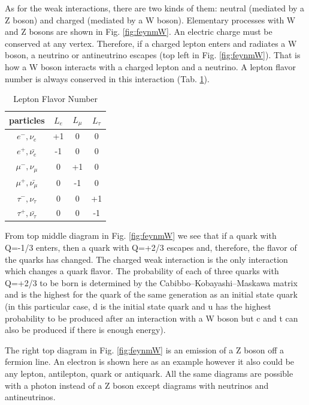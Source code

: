 As for the weak interactions, there are two kinds of them: neutral (mediated by a Z boson) and charged (mediated by a W boson). Elementary processes with W and Z bosons are shown in Fig. \ref{fig:feynmW}. An electric charge must be conserved at any vertex. Therefore, if a charged lepton enters and radiates a W boson, a neutrino or antineutrino escapes (top left in Fig. \ref{fig:feynmW}). That is how a W boson interacts with a charged lepton and a neutrino. A lepton flavor number is always conserved in this interaction (Tab. \ref{tab:LeptonFlavorNumber}). 

 \begin{table}[h]
  \begin{center}
  \caption{ Lepton Flavor Number}
  \begin{tabular}{|c|c|c|c|}
     particles & $L_e$ & $L_{\mu}$ & $L_{\tau}$ \\ \hline
     $e^-,\nu_e$ &  +1  &  0  &  0  \\ \hline 
     $e^+, \bar{\nu_e}$ &  -1  &  0  &  0  \\ \hline 
     $\mu^-,\nu_{\mu}$ &  0  &  +1  &  0  \\ \hline 
     $\mu^+, \bar{\nu_{\mu}}$ &  0  &  -1  &  0  \\ \hline 
     $\tau^-,\nu_{\tau}$ &  0  &  0  &  +1  \\ \hline 
     $\tau^+, \bar{\nu_{\tau}}$ &  0  &  0  &  -1  \\ \hline 
  \end{tabular}
  \label{tab:LeptonFlavorNumber}
  \end{center}
\end{table}

From top middle diagram in Fig. \ref{fig:feynmW} we see that if a quark with Q=-1/3 enters, then a quark with Q=+2/3 escapes and, therefore, the flavor of the quarks has changed. The charged weak interaction is the only interaction which changes a quark flavor. The probability of each of three quarks with Q=+2/3 to be born is determined by the Cabibbo–Kobayashi–Maskawa matrix and is the highest for the quark of the same generation as an initial state quark (in this particular case, d is the initial state quark and u has the highest probability to be produced after an interaction with a W boson but c and t can also be produced if there is enough energy).

The right top diagram in Fig. \ref{fig:feynmW} is an emission of a Z boson off a fermion line. An electron is shown here as an example however it also could be any lepton, antilepton, quark or antiquark. All the same diagrams are possible with a photon instead of a Z boson except diagrams with neutrinos and antineutrinos.

